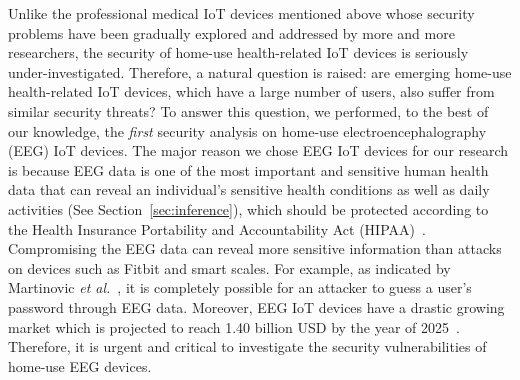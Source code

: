 \indent Unlike the professional medical IoT devices mentioned above whose security problems have been gradually explored and addressed by more and more researchers, the security of home-use health-related IoT devices is seriously under-investigated. Therefore, a natural question is raised: are emerging home-use health-related IoT devices, which have a large number of users, also suffer from similar security threats? To answer this question, we performed, to the best of our knowledge, the \emph{first} security analysis on home-use electroencephalography (EEG) IoT devices. The major reason we chose EEG IoT devices for our research is because EEG data is one of the most important and sensitive human health data that can reveal an individual's sensitive health conditions as well as daily activities (See Section~\ref{sec:inference}), which should be protected according to the Health Insurance Portability and Accountability Act (HIPAA)~\cite{hipaa}. Compromising the EEG data can reveal more sensitive information than attacks on devices such as Fitbit and smart scales. For example, as indicated by Martinovic \emph{et al.}~\cite{martinovic2012feasibility}, it is completely possible for an attacker to guess a user's password through EEG data. Moreover, EEG IoT devices have a drastic growing market which is projected to reach 1.40 billion USD by the year of 2025~\cite{2025eegdevicemarket}. Therefore, it is urgent and critical to investigate the security vulnerabilities of home-use EEG devices.\\
%
